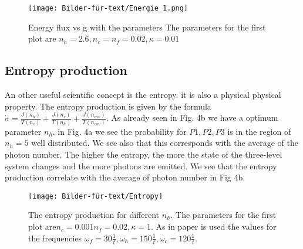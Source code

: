 \documentclass[12pt,a4paper]{article}
\begin{document}
\begin{figure}[hbtp]
\centering
\texttt{[image: Bilder-für-text/Energie\_1.png]}
\caption{Energy flux vs g with the parameters The parameters for the first plot are $ n_h=2.6,n_c= n_f=0.02,\kappa=0.01 $}
\end{figure}


\subsection{Entropy production}
An other useful scientific concept is the entropy. it is also a physical physical property. 
The entropy production is given by the formula\\ $\dot{\sigma} =\frac{J(n_h)}{T(n_c)}+\frac{J(n_c)}{T(n_h)}+\frac{J(n_{cav})}{T(n_{cav})}$.
As already seen in Fig. 4b we have a optimum parameter $n_h$.  in Fig. 4a we see the probability for $P1,P2,P3$ is in the region of $n_h=5 $ well distributed. We see also that  this corresponds with the average of the photon number.
The higher the entropy, the more the state of the three-level system changes and the more photons are emitted.
We see that the entropy production correlate with the average of photon number in Fig 4b.
\begin{figure}[hbtp]
\centering
\texttt{[image: Bilder-für-text/Entropy]}
\caption{The entropy production for different $n_h$. The parameters for the first plot are$n_c=0.001 n_f=0.02,\kappa=1$. As in paper \cite{Li2017} is used the values for the frequencies $\omega_f=30\frac{1}{t},\omega_h=150\frac{1}{t}, \omega_c=120\frac{1}{t}$.}
\end{figure}



\newpage
\end{document}

